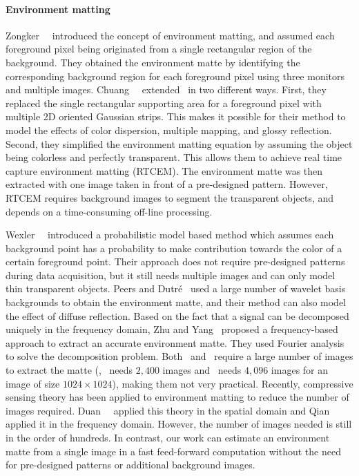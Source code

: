 \paragraph{Environment matting}
\label{par:Environment Matting}
Zongker~\etal~\cite{zongker1999environment} introduced the concept of environment matting, and assumed each foreground pixel being originated from a single rectangular region of the background. They obtained the environment matte by identifying the corresponding background region for each foreground pixel using three monitors and multiple images. Chuang~\etal~\cite{chuang2000environment} extended~\cite{zongker1999environment} in two different ways. First, they replaced the single rectangular supporting area for a foreground pixel with multiple 2D oriented Gaussian strips. This makes it possible for their method to model the effects of color dispersion, multiple mapping, and glossy reflection. Second, they simplified the environment matting equation by assuming the object being colorless and perfectly transparent. This allows them to achieve real time capture environment matting (RTCEM). The environment matte was then extracted with one image taken in front of a pre-designed pattern. However, RTCEM requires background images to segment the transparent objects, and depends on a time-consuming off-line processing. 

Wexler~\etal~\cite{wexler2002image} introduced a probabilistic model based method which assumes each background point has a probability to make contribution towards the color of a certain foreground point. Their approach does not require pre-designed patterns during data acquisition, but it still needs multiple images and can only model thin transparent objects. Peers and Dutr{\'e}~\cite{peers2003wavelet} used a large number of wavelet basis backgrounds to obtain the environment matte, and their method can also model the effect of diffuse reflection. Based on the fact that a signal can be decomposed uniquely in the frequency domain, Zhu and Yang~\cite{zhu2004frequency} proposed a frequency-based approach to extract an accurate environment matte. They used Fourier analysis to solve the decomposition problem. Both~\cite{peers2003wavelet} and~\cite{zhu2004frequency} require a large number of images to extract the matte (\eg,~\cite{peers2003wavelet} needs $2,400$ images and~\cite{zhu2004frequency} needs $4,096$ images for an image of size $1024\times 1024$), making them not very practical. Recently, compressive sensing theory has been applied to environment matting to reduce the number of images required. Duan~\etal~\cite{duan2011fast} applied this theory in  the spatial domain and Qian~\etal~\cite{qian2015frequency} applied it in the frequency domain. However, the number of images needed is still in the order of hundreds. In contrast, our work can estimate an environment matte from a single image in a fast feed-forward computation without the need for pre-designed patterns or additional background images.

